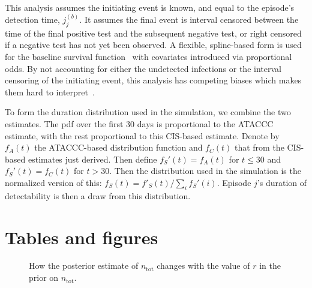 \documentclass{article}
\newcommand{\ntot}{n_\text{tot}}
\begin{document}
This analysis assumes the initiating event is known, and equal to the episode’s detection time, $j_j^{(b)}$.
It assumes the final event is interval censored between the time of the final positive test and the subsequent negative test, or right censored if a negative test has not yet been observed.
A flexible, spline-based form is used for the baseline survival function~\citep{roystonSTPM,roystonFlexible} with covariates introduced via proportional odds.
By not accounting for either the undetected infections or the interval censoring of the initiating event, this analysis has competing biases which makes them hard to interpret~\citep{cisMethodsONS}.

To form the duration distribution used in the simulation, we combine the two estimates.
The pdf over the first 30 days is proportional to the ATACCC estimate, with the rest proportional to this CIS-based estimate.
Denote by $f_A(t)$ the ATACCC-based distribution function and $f_C(t)$ that from the CIS-based estimates just derived.
Then define $f_S'(t) = f_A(t)$ for $t \leq 30$ and $f_S'(t) = f_C(t)$ for $t > 30$.
Then the distribution used in the simulation is the normalized version of this: $f_S(t) = f'_S(t)/\sum_i f_S'(i)$.
Episode $j$'s duration of detectability is then a draw from this distribution.





\section{Tables and figures}

\begin{figure}[!h]
  
  \caption[Sensitivity of $\ntot$'s posterior to its prior.]{How the posterior estimate of $\ntot$ changes with the value of $r$ in the prior on $\ntot$.}
  \label{imperf-test:fig:ntot}
\end{figure}

\begin{table}[!h]
\thispagestyle{empty}
\vspace{-1.5cm}

\caption{%
  Demographic information.
  Population \% from 2020 mid-year population estimates~\citep{onsPopulationEstimates}, except ethnicity which uses the England \& Wales 2021 census~\citep{onsEthnicity2021}.
  Population data source: Office for National Statistics licensed under \href{https://www.nationalarchives.gov.uk/doc/open-government-licence/version/3/}{the Open Government Licence v.3.0}.
}
\end{table}
\end{document}
